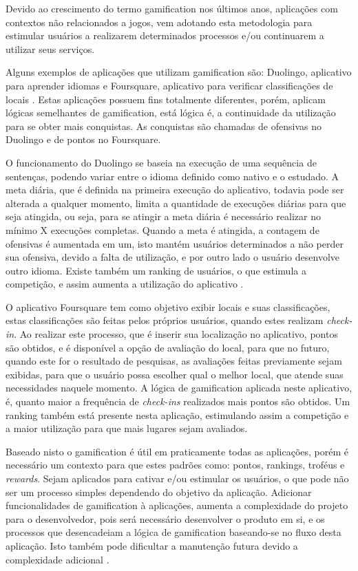 \par Devido ao crescimento do termo gamification nos últimos anos, \cite{groh2012gamification} aplicações com contextos não relacionados a jogos, vem adotando esta metodologia para estimular usuários a realizarem determinados processos e/ou continuarem a utilizar seus serviços. 
\par Alguns exemplos de aplicações que utilizam gamification são: Duolingo, aplicativo para aprender idiomas \cite{melo2016eficiencia} e Foursquare, aplicativo para verificar classificações de locais \cite{huotari2012defining}. Estas aplicações possuem fins totalmente diferentes, porém, aplicam lógicas semelhantes de gamification, está lógica é, a continuidade da utilização para se obter mais conquistas. As conquistas são chamadas de ofensivas no Duolingo e de pontos no Foursquare.
\par O funcionamento do Duolingo se baseia na execução de uma sequência de sentenças, podendo variar entre o idioma definido como nativo e o estudado. A meta diária, que é definida na primeira execução do aplicativo, todavia pode ser alterada a qualquer momento, limita a quantidade de execuções diárias para que seja atingida, ou seja, para se atingir a meta diária é necessário realizar no mínimo X execuções completas. Quando a meta é atingida, a contagem de ofensivas é aumentada em um, isto mantém usuários determinados a não perder sua ofensiva, devido a falta de utilização, e por outro lado o usuário desenvolve outro idioma. Existe também um ranking de usuários, o que estimula a competição, e assim aumenta a utilização do aplicativo \cite{melo2016eficiencia}. 
\par O aplicativo Foursquare tem como objetivo exibir locais e suas classificações, estas classificações são feitas pelos próprios usuários, quando estes realizam \textit{check-in}. Ao realizar este processo, que é inserir sua localização no aplicativo, pontos são obtidos, e é disponível a opção de avaliação do local, para que no futuro, quando este for o resultado de pesquisas, as avaliações feitas previamente sejam exibidas, para que o usuário possa escolher qual o melhor local, que atende suas necessidades naquele momento. A lógica de gamification aplicada neste aplicativo, é, quanto maior a frequência de \textit{check-ins} realizados mais pontos são obtidos. Um ranking também está presente nesta aplicação, estimulando assim a competição e a maior utilização para que mais lugares sejam avaliados\cite{huotari2012defining}.
\par Baseado nisto o gamification é útil em praticamente todas as aplicações, porém é necessário um contexto para que estes padrões como: pontos, rankings, troféus e \textit{rewards}. Sejam aplicados para cativar e/ou estimular os usuários, o que pode não ser um processo simples dependendo do objetivo da aplicação. Adicionar funcionalidades de gamification à aplicações, aumenta a complexidade do projeto para o desenvolvedor, pois será necessário desenvolver o produto em si, e os processos que desencadeiam a lógica de gamification baseando-se no fluxo desta aplicação. Isto também pode dificultar a manutenção futura devido a complexidade adicional \cite{guerra2017approach}.

